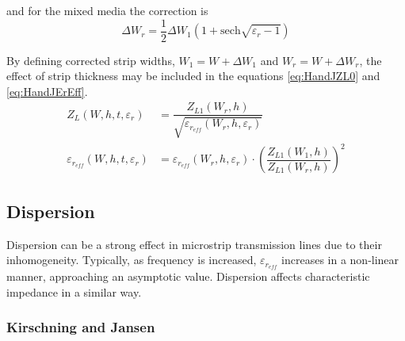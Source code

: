 \documentclass[10pt]{report}
\begin{document}
and for the mixed media the correction is
\begin{equation}
\Delta W_r = \dfrac{1}{2} \Delta W_1 \left(1 + \text{sech} \sqrt{\varepsilon_r - 1}\right)
\end{equation}

By defining corrected strip widths, $W_1 = W + \Delta W_1$ and $W_r =
W + \Delta W_r$, the effect of strip thickness may be included in the
equations \eqref{eq:HandJZL0} and \eqref{eq:HandJErEff}.
\begin{align}
Z_L \left(W, h, t, \varepsilon_r\right) &= \dfrac{Z_{L1} \left(W_r, h\right)}{\sqrt{\varepsilon_{r_{eff}} \left(W_r, h, \varepsilon_r\right)}}\\
\varepsilon_{r_{eff}} \left(W, h, t, \varepsilon_r\right) &= \varepsilon_{r_{eff}} \left(W_r, h, \varepsilon_r\right) \cdot \left(\dfrac{Z_{L1} \left(W_1, h\right)}{Z_{L1} \left(W_r, h\right)}\right)^2
\end{align}

\subsection{Dispersion}

Dispersion can be a strong effect in microstrip transmission lines due
to their inhomogeneity.  Typically, as frequency is increased,
$\varepsilon_{r_{eff}}$ increases in a non-linear manner, approaching
an asymptotic value.  Dispersion affects characteristic impedance in a
similar way.

\subsubsection{Kirschning and Jansen}
\end{document}

